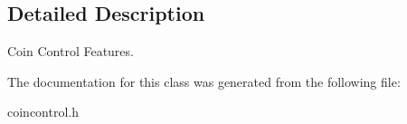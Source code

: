 \subsection{Detailed Description}
Coin Control Features. 

The documentation for this class was generated from the following file\+:\begin{DoxyCompactItemize}
\item 
coincontrol.\+h\end{DoxyCompactItemize}
